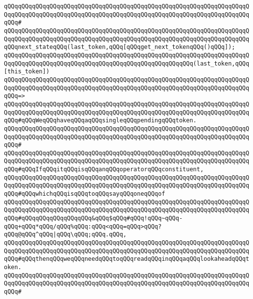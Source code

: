 \verb|qQQqqQQqqQQqqQQqqQQqqQQqqQQqqQQqqQQqqQQqqQQqqQQqqQQqqQQqqQQqqQQqqQQqqQQqqQQqqQQqqQQqqQQqqQQqqQQqqQQqqQQqqQQqqQQqqQQqqQQqqQQqqQQqqQQqqQQqqQQqqQQq#|\newline
\verb|qQQqqQQqqQQqqQQqqQQqqQQqqQQqqQQqqQQqqQQqqQQqqQQqqQQqqQQqqQQqqQQqqQQqqQQqqQQqqQQqqQQqqQQqqQQqqQQqqQQqqQQqqQQqqQQqqQQqqQQqqQQqqQQqqQQqqQQqqQQqqQQqnext_stateqQQq(last_token,qQQq[qQQqget_next_tokenqQQq()qQQq]);|\newline
\newline
\verb|qQQqqQQqqQQqqQQqqQQqqQQqqQQqqQQqqQQqqQQqqQQqqQQqqQQqqQQqqQQqqQQqqQQqqQQqqQQqqQQqqQQqqQQqqQQqqQQqqQQqqQQqqQQqqQQqqQQqqQQqqQQq(last_token,qQQq[this_token])|\newline
\verb|qQQqqQQqqQQqqQQqqQQqqQQqqQQqqQQqqQQqqQQqqQQqqQQqqQQqqQQqqQQqqQQqqQQqqQQqqQQqqQQqqQQqqQQqqQQqqQQqqQQqqQQqqQQqqQQqqQQqqQQqqQQqqQQqqQQqqQQqqQQqqQQq=>|\newline
\verb|qQQqqQQqqQQqqQQqqQQqqQQqqQQqqQQqqQQqqQQqqQQqqQQqqQQqqQQqqQQqqQQqqQQqqQQqqQQqqQQqqQQqqQQqqQQqqQQqqQQqqQQqqQQqqQQqqQQqqQQqqQQqqQQqqQQqqQQqqQQqqQQq#qQQqWeqQQqhaveqQQqaqQQqsingleqQQqpendingqQQqtoken.|\newline
\verb|qQQqqQQqqQQqqQQqqQQqqQQqqQQqqQQqqQQqqQQqqQQqqQQqqQQqqQQqqQQqqQQqqQQqqQQqqQQqqQQqqQQqqQQqqQQqqQQqqQQqqQQqqQQqqQQqqQQqqQQqqQQqqQQqqQQqqQQqqQQqqQQq#|\newline
\verb|qQQqqQQqqQQqqQQqqQQqqQQqqQQqqQQqqQQqqQQqqQQqqQQqqQQqqQQqqQQqqQQqqQQqqQQqqQQqqQQqqQQqqQQqqQQqqQQqqQQqqQQqqQQqqQQqqQQqqQQqqQQqqQQqqQQqqQQqqQQqqQQq#qQQqIfqQQqitqQQqisqQQqanqQQqoperatorqQQqconstituent,|\newline
\verb|qQQqqQQqqQQqqQQqqQQqqQQqqQQqqQQqqQQqqQQqqQQqqQQqqQQqqQQqqQQqqQQqqQQqqQQqqQQqqQQqqQQqqQQqqQQqqQQqqQQqqQQqqQQqqQQqqQQqqQQqqQQqqQQqqQQqqQQqqQQqqQQq#qQQqwhichqQQqisqQQqtoqQQqsayqQQqoneqQQqof|\newline
\verb|qQQqqQQqqQQqqQQqqQQqqQQqqQQqqQQqqQQqqQQqqQQqqQQqqQQqqQQqqQQqqQQqqQQqqQQqqQQqqQQqqQQqqQQqqQQqqQQqqQQqqQQqqQQqqQQqqQQqqQQqqQQqqQQqqQQqqQQqqQQqqQQq#qQQqqQQqqQQqqQQqqQQq&qQQq$qQQq#qQQq!qQQq~qQQq-qQQq+qQQq*qQQq/qQQq%qQQq:qQQq<qQQq=qQQq>qQQq?qQQq@qQQq^qQQq|\verb#|qQQq\qQQq;qQQq.qQQq,#\newline
\verb|qQQqqQQqqQQqqQQqqQQqqQQqqQQqqQQqqQQqqQQqqQQqqQQqqQQqqQQqqQQqqQQqqQQqqQQqqQQqqQQqqQQqqQQqqQQqqQQqqQQqqQQqqQQqqQQqqQQqqQQqqQQqqQQqqQQqqQQqqQQqqQQq#qQQqthenqQQqweqQQqneedqQQqtoqQQqreadqQQqinqQQqaqQQqlookaheadqQQqtoken.|\newline
\verb|qQQqqQQqqQQqqQQqqQQqqQQqqQQqqQQqqQQqqQQqqQQqqQQqqQQqqQQqqQQqqQQqqQQqqQQqqQQqqQQqqQQqqQQqqQQqqQQqqQQqqQQqqQQqqQQqqQQqqQQqqQQqqQQqqQQqqQQqqQQqqQQq#|\newline
